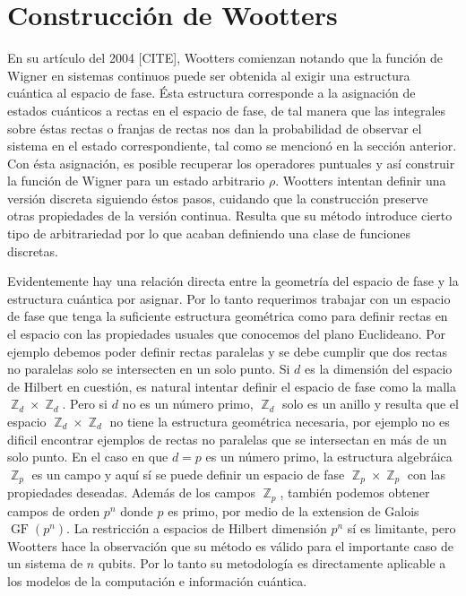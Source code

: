 \documentclass[a4paper]{report}
\DeclareMathOperator{\Z}{\mathbb{Z}}
\DeclareMathOperator{\GF}{GF}
\begin{document}
  \section{Construcción de Wootters}

  En su artículo del 2004 [CITE], Wootters comienzan notando
  que la función de Wigner en sistemas continuos puede ser
  obtenida al exigir una estructura cuántica al espacio de
  fase. Ésta estructura corresponde a la asignación de
  estados cuánticos a rectas en el espacio de fase, de tal
  manera que las integrales sobre éstas rectas o franjas de
  rectas nos dan la probabilidad de observar el sistema en
  el estado correspondiente, tal como se mencionó en la
  sección anterior. Con ésta asignación, es posible
  recuperar los operadores puntuales y así construir la
  función de Wigner para un estado arbitrario $\rho$.
  Wootters intentan definir una versión discreta siguiendo
  éstos pasos, cuidando que la construcción preserve otras
  propiedades de la versión continua.  Resulta que su método
  introduce cierto tipo de arbitrariedad por lo que acaban
  definiendo una clase de funciones discretas.

  Evidentemente hay una relación directa entre la geometría
  del espacio de fase y la estructura cuántica por asignar.
  Por lo tanto requerimos trabajar con un espacio de fase
  que tenga la suficiente estructura geométrica como para
  definir rectas en el espacio con las propiedades usuales
  que conocemos del plano Euclideano.  Por ejemplo debemos
  poder definir rectas paralelas y se debe cumplir que dos
  rectas no paralelas solo se intersecten en un solo punto.
  Si $d$ es la dimensión del espacio de Hilbert en cuestión,
  es natural intentar definir el espacio de fase como la
  malla $\Z_d \times \Z_d$. Pero si $d$ no es un número
  primo, $\Z_d$ solo es un anillo y resulta que el espacio
  $\Z_d \times \Z_d$ no tiene la estructura geométrica
  necesaria, por ejemplo no es dificil encontrar ejemplos de
  rectas no paralelas que se intersectan en más de un solo
  punto. En el caso en que $d = p$ es un número primo, la
  estructura algebráica $\Z_p$ es un campo y aquí sí se
  puede definir un espacio de fase $\Z_p \times \Z_p$ con
  las propiedades deseadas.  Además de los campos $\Z_p$,
  también podemos obtener campos de orden $p^{n}$ donde $p$
  es primo, por medio de la extension de Galois
  $\GF\left(p^{n}\right)$.  La restricción a espacios de
  Hilbert dimensión $p^{n}$ sí es limitante, pero Wootters
  hace la observación que su método es válido para el
  importante caso de un sistema de $n$ qubits. Por lo tanto
  su metodología es directamente aplicable a los modelos de
  la computación e información cuántica.
\end{document}
